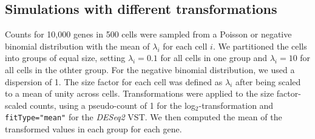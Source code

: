 \documentclass[10pt,letterpaper]{article}
\newcommand\code[1]{{\small\texttt{#1}}}
\begin{document}
\subsection{Simulations with different transformations}
Counts for 10,000 genes in 500 cells were sampled from a Poisson or negative binomial distribution with the mean of $\lambda_i$ for each cell $i$.
We partitioned the cells into groups of equal size, setting $\lambda_i=0.1$ for all cells in one group and $\lambda_i=10$ for all cells in the othter group.
For the negative binomial distribution, we used a dispersion of 1.
The size factor for each cell was defined as $\lambda_i$ after being scaled to a mean of unity across cells.
Transformations were applied to the size factor-scaled counts, using a pseudo-count of 1 for the log$_2$-transformation and \code{fitType="mean"} for the \textit{DESeq2} VST.
We then computed the mean of the transformed values in each group for each gene.



\end{document}
